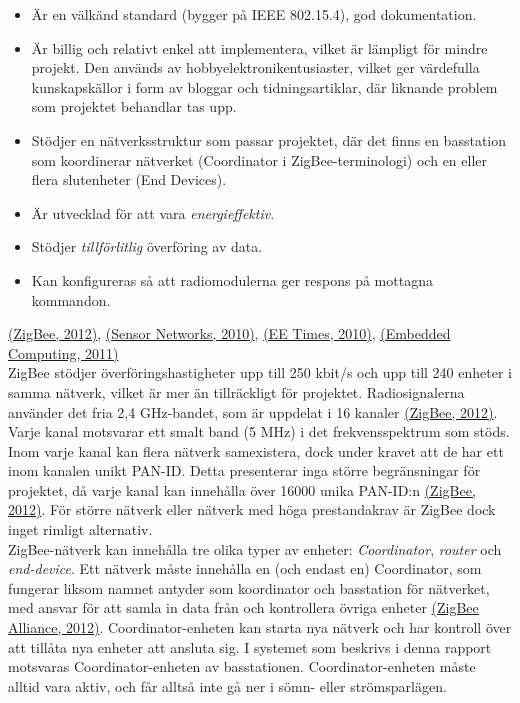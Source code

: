 \documentclass[a4paper,11pt]{article}
\begin{document}
	\begin{itemize}
    	\item Är en välkänd standard (bygger på IEEE 802.15.4), god dokumentation.
    	\item Är billig och relativt enkel att implementera, vilket är lämpligt för mindre projekt. Den används av hobbyelektronikentusiaster, vilket ger värdefulla kunskapskällor i form av bloggar och tidningsartiklar, där liknande problem som projektet behandlar tas upp.
    	\item Stödjer en nätverksstruktur som passar projektet, där det finns en basstation som koordinerar nätverket (Coordinator i ZigBee-terminologi) och en eller flera slutenheter (End Devices).
    	\item Är utvecklad för att vara {\it energieffektiv}.
    	\item Stödjer {\it tillförlitlig} överföring av data.
    	\item Kan konfigureras så att radiomodulerna ger respons på mottagna kommandon.
    	\end{itemize}
\hyperref[zigbee]{(ZigBee, 2012)}, \hyperref[sensornetworks]{(Sensor Networks, 2010)}, \hyperref[eetimes]{(EE Times, 2010)}, \hyperref[embedded]{(Embedded Computing, 2011)}\\
    	
ZigBee stödjer överföringshastigheter upp till 250 kbit/s och upp till 240 enheter i samma nätverk, vilket är mer än tillräckligt för projektet. Radiosignalerna använder det fria 2,4 GHz-bandet, som är uppdelat i 16 kanaler \hyperref[zigbee]{(ZigBee, 2012)}. Varje kanal motsvarar ett smalt band (5 MHz) i det frekvensspektrum som stöds. Inom varje kanal kan flera nätverk samexistera, dock under kravet att de har ett inom kanalen unikt PAN-ID. Detta presenterar inga större begränsningar för projektet, då varje kanal kan innehålla över 16000 unika PAN-ID:n \hyperref[zigbee]{(ZigBee, 2012)}. För större nätverk eller nätverk med höga prestandakrav är ZigBee dock inget rimligt alternativ. \\

ZigBee-nätverk kan innehålla tre olika typer av enheter: {\it Coordinator}, {\it router} och {\it end-device}. Ett nätverk måste innehålla en (och endast en) Coordinator, som fungerar liksom namnet antyder som koordinator och basstation för nätverket, med ansvar för att samla in data från och kontrollera övriga enheter \hyperref[zigbee]{(ZigBee Alliance, 2012)}. Coordinator-enheten kan starta nya nätverk och har kontroll över att tillåta nya enheter att ansluta sig. I systemet som beskrivs i denna rapport motsvaras Coordinator-enheten av basstationen. Coordinator-enheten måste alltid vara aktiv, och får alltså inte gå ner i sömn- eller strömsparlägen. \\
\end{document}
